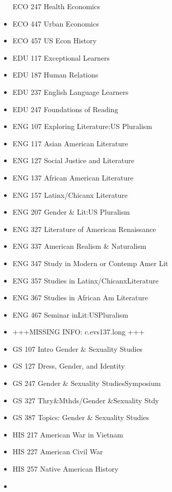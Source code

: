 \documentclass[
  letterpaper,
]{scrbook}
\begin{document}
\begin{itemize}
  ECO 247 Health Economics\\
\item
  ECO 447 Urban Economics\\
\item
  ECO 457 US Econ History\\
\item
  EDU 117 Exceptional Learners\\
\item
  EDU 187 Human Relations\\
\item
  EDU 237 English Language Learners
\item
  EDU 247 Foundations of Reading\\
\item
  ENG 107 Exploring Literature:US Pluralism
\item
  ENG 117 Asian American Literature
\item
  ENG 127 Social Justice and Literature
\item
  ENG 137 African American Literature
\item
  ENG 157 Latinx/Chicanx Literature
\item
  ENG 207 Gender \& Lit:US Pluralism
\item
  ENG 327 Literature of American Renaissance
\item
  ENG 337 American Realism \& Naturalism
\item
  ENG 347 Study in Modern or Contemp Amer Lit
\item
  ENG 357 Studies in Latinx/ChicanxLiterature
\item
  ENG 367 Studies in African Am Literature
\item
  ENG 467 Seminar inLit:USPluralism
\item
  +++MISSING INFO: c.evs137.long +++
\item
  GS 107 Intro Gender \& Sexuality Studies
\item
  GS 127 Dress, Gender, and Identity
\item
  GS 247 Gender \& Sexuality StudiesSymposium
\item
  GS 327 Thry\&Mthds/Gender \&Sexuality Stdy
\item
  GS 387 Topics: Gender \& Sexuality Studies
\item
  HIS 217 American War in Vietnam
\item
  HIS 227 American Civil War\\
\item
  HIS 257 Native American History
\item

\end{itemize}
\end{document}

